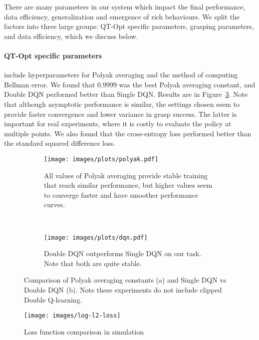 \documentclass{article}
\begin{document}
There are many parameters in our system which impact the final performance, data efficiency, generalization and emergence of rich behaviours. We split the factors into three large groups: QT-Opt specific parameters, grasping parameters, and data efficiency, which we discuss below.
\vspace{-0.1in}\paragraph{QT-Opt specific parameters} include hyperparameters for Polyak averaging and the method of computing Bellman error. We found that $0.9999$ was the best Polyak averaging constant, and Double DQN performed better than Single DQN. Results are in Figure~\ref{fig:qtopt-comparison}. Note that although asymptotic performance is similar, the settings chosen seem to provide faster convergence and lower variance in grasp success. The latter is important for real experiments, where it is costly to evaluate the policy at multiple points. We also found that the cross-entropy loss performed better than the standard squared difference loss.

\begin{figure}[h]
    \centering
    \begin{subfigure}[t]{0.45\textwidth}
        \centering
        \texttt{[image: images/plots/polyak.pdf]}
        \caption{All values of Polyak averaging provide stable training that reach similar performance, but higher values seem to converge faster and have smoother performance curves.}
        \label{fig:polyak-comparison}
    \end{subfigure}
    ~
    \begin{subfigure}[t]{0.45\textwidth}
        \centering
        \texttt{[image: images/plots/dqn.pdf]}
        \caption{Double DQN outperforms Single DQN on our task. Note that both are quite stable.}
        \label{fig:dqn-comparison}
    \end{subfigure}
    \caption{Comparison of Polyak averaging constants (a) and Single DQN vs Double DQN (b). Note these experiments do not include clipped Double Q-learning.}
    \label{fig:qtopt-comparison}
\end{figure}\begin{figure}[h]
\centering
 \texttt{[image: images/log-l2-loss]}
   \caption{Loss function comparison in simulation}
\label{fig:sim-loss-graphs}
\end{figure}
\end{document}
